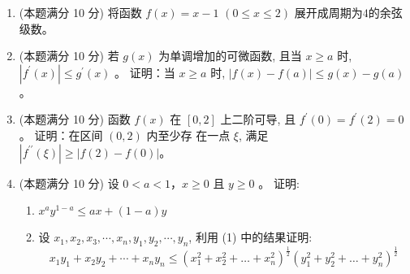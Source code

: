 \begin{enumerate}
\item 
(本题满分 10 分)
将函数 $f(x)=x-1$ $(0 \leqslant x \leqslant 2)$ 展开成周期为$  4  $的余弦级数。



\item 
(本题满分 10 分)
若 $g(x)$ 为单调增加的可微函数, 且当 $x \geqslant a$ 时, $\left|f^{\prime }(x)\right| \leqslant g^{\prime }(x)$ 。 证明：当 $x \geqslant a$ 时, $|f(x)-f(a)| \leqslant g(x)-g(a)$。




\item 
(本题满分 10 分)
函数 $f(x)$ 在 $[0,2]$ 上二阶可导, 且 $f^{\prime}(0)=f^{\prime}(2)=0$ 。 证明：在区间 $(0,2)$ 内至少存 在一点 $\xi$, 满足 $\left|f^{\prime \prime}(\xi)\right| \geqslant|f(2)-f(0)|$。




\item 
(本题满分 10 分)
设 $0<a<1$，$ x \geqslant 0$ 且 $y \geqslant 0$ 。 证明:
\begin{enumerate}
	\item
$x^{a} y^{1-a} \leqslant a x+(1-a) y$
\item 
设 $x_{1}, x_{2}, x_{3}, \cdots, x_{n}, y_{1}, y_{2}, \cdots, y_{n}$, 利用 (1) 中的结果证明:
\[
x_{1} y_{1}+x_{2} y_{2}+\cdots+x_{n} y_{n} \leqslant\left(x_{1}^{2}+x_{2}^{2}+\ldots+x_{n}^{2}\right)^{\frac{1}{2}}\left(y_{1}^{2}+y_{2}^{2}+\ldots+y_{n}^{2}\right)^{\frac{1}{2}}
\]
\end{enumerate}


\end{enumerate}
